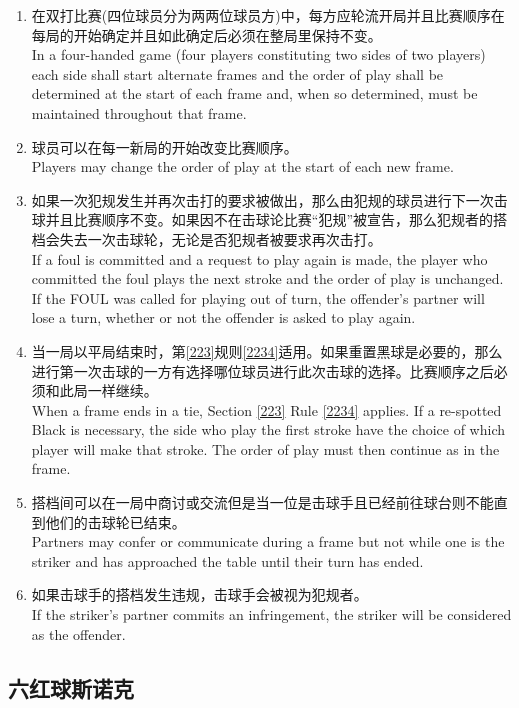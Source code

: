 \begin{enumerate}[label=(\alph*)]
    \item 在双打比赛(四位球员分为两两位球员方)中，每方应轮流开局并且比赛顺序在每局的开始确定并且如此确定后必须在整局里保持不变。\\
    In a four-handed game (four players constituting two sides of two players) each side shall start alternate frames and the order of play shall be determined at the start of each frame and, when so determined, must be maintained throughout that frame.
    \item 球员可以在每一新局的开始改变比赛顺序。\\
    Players may change the order of play at the start of each new frame.
    \item 如果一次犯规发生并再次击打的要求被做出，那么由犯规的球员进行下一次击球并且比赛顺序不变。如果因不在击球论比赛``犯规''被宣告，那么犯规者的搭档会失去一次击球轮，无论是否犯规者被要求再次击打。\\
    If a foul is committed and a request to play again is made, the player who committed the foul plays the next stroke and the order of play is unchanged. If the FOUL was called for playing out of turn, the offender's partner will lose a turn, whether or not the offender is asked to play again.
    \item 当一局以平局结束时，第\ref{223}规则\ref{2234}适用。如果重置黑球是必要的，那么进行第一次击球的一方有选择哪位球员进行此次击球的选择。比赛顺序之后必须和此局一样继续。\\
    When a frame ends in a tie, Section \ref{223} Rule \ref{2234} applies. If a re-spotted Black is necessary, the side who play the first stroke have the choice of which player will make that stroke. The order of play must then continue as in the frame.
    \item \label{22318e}搭档间可以在一局中商讨或交流但是当一位是击球手且已经前往球台则不能直到他们的击球轮已结束。\\
    Partners may confer or communicate during a frame but not while one is the striker and has approached the table until their turn has ended. 
    \item 如果击球手的搭档发生违规，击球手会被视为犯规者。\\
    If the striker's partner commits an infringement, the striker will be considered as the offender.
\end{enumerate}

\subsection{六红球斯诺克}

